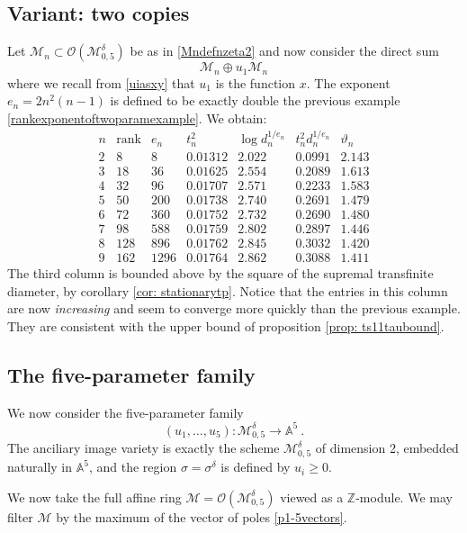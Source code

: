 \documentclass[a4paper,10pt]{amsart}
\theoremstyle{definition}
\theoremstyle{remark}
\numberwithin{equation}{section}
\newcommand{\To}{\longrightarrow}
\newcommand{\Z}{\mathbb Z}
\newcommand{\Or}{\mathcal{O}}
\newcommand{\0}{\color{blue}{\mathsf{0}}}
\begin{document}
\subsection{Variant: two copies}  
Let $\mathcal{M}_n \subset \Or(\mathcal{M}_{0,5}^{\delta})$ be as in \eqref{Mndefnzeta2} and now  consider the direct sum 
\[  \mathcal{M}_n \oplus u_1 \mathcal{M}_n\]
where  we recall from \eqref{uiasxy} that $u_1$ is the function $x$.  The exponent $e_n =2n^2(n-1)$ is defined to be exactly double the previous example \eqref{rankexponentoftwoparamexample}. 
We obtain:
\[
\begin{array}{c|cccccc}
 n  & \mathrm{rank} & e_n   & t^2_n & \log d^{1/e_n}_n  &  t^2_n d_n^{1/e_n} & \vartheta_n    \\ \hline
2    & 8 & 8  &  0.01312   &  2.022   &  0.0991 & 2.143  \\
 3  & 18 & 36  &  0.01625 & 2.554   & 0.2089  &   1.613 \\
 4 & 32& 96  &  0.01707 &   2.571 & 0.2233  &   1.583  \\
 5 & 50& 200  &  0.01738 & 2. 740 &   0.2691 &   1.479 \\
 6 & 72 & 360  &   0.01752 & 2.732  &  0.2690  &   1.480 \\
 7 & 98& 588 &    0.01759   & 2.802 &  0.2897 &   1.446 \\
 8 & 128 &896 &  0.01762 & 2.845 & 0.3032 &   1.420  \\
 9 & 162& 1296 & 0.01764 & 2.862 & 0.3088 & 1.411 
\end{array}
\]
The third column is bounded above by the square of the supremal transfinite diameter, by corollary \ref{cor: stationarytp}.
Notice that the entries in this column are now \emph{increasing} and seem to converge more quickly than the previous example.
They are  consistent with the upper bound    of proposition \ref{prop: ts11taubound}.

  
   \subsection{The five-parameter family}
We now consider the five-parameter family
\[ (u_1,\ldots, u_5) : \mathcal{M}_{0,5}^{\delta} \To \mathbb{A}^5 \ . \]
  The anciliary image variety is exactly the scheme $\mathcal{M}_{0,5}^{\delta}$ of dimension 2, embedded naturally in $\mathbb{A}^5$, and 
the region $\sigma= \sigma^{\delta}$ is  defined by $u_i\geq 0$.




We now take the  full affine ring $ \mathcal{M}= \mathcal{O}(\mathcal{M}_{0,5}^{\delta})$ viewed as a $\Z$-module.    
We may filter $\mathcal{M}$ by the maximum of the vector of poles \eqref{p1-5vectors}.
\end{document}
